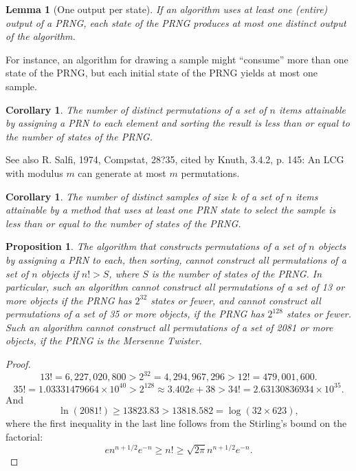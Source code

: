 \documentclass[12pt]{article}
\newtheorem{lemma}[theorem]{Lemma}
\newtheorem{corollary}[theorem]{Corollary}
\newtheorem{proposition}[theorem]{Proposition}
\begin{document}
\begin{lemma}[One output per state]
If an algorithm uses at least one (entire) output of a PRNG, each state of the PRNG produces at most one distinct output of the algorithm.
\end{lemma}

For instance, an algorithm for drawing a sample might ``consume'' more than one state of the PRNG, but each initial state of the PRNG yields at most one sample.

\begin{corollary}
The number of distinct permutations of a set of $n$ items attainable by assigning a PRN to each element and sorting the result is less than or equal to the number of states of the PRNG.
\end{corollary}

See also R. Salfi, 1974, Compstat, 28?35, cited by Knuth, 3.4.2, p. 145: An LCG with modulus $m$ can generate at most $m$ permutations.

\begin{corollary}
The number of distinct samples of size $k$ of a set of $n$ items attainable by a method that uses at least one PRN state to select the sample is less than or equal to the number of states of the PRNG.
\end{corollary}

\begin{proposition}
The algorithm that constructs permutations of a set of $n$ objects by assigning a PRN to each, then sorting, cannot construct all permutations of a set of $n$ objects if $n! > S$, where $S$ is the number of states of the PRNG. In particular, such an algorithm cannot construct all permutations of a set of 13 or more objects if the PRNG has $2^{32}$ states or fewer, and cannot construct all permutations of a set of 35 or more objects, if the PRNG has $2^{128}$ states or fewer. Such an algorithm cannot construct all permutations of a set of 2081 or more objects, if the PRNG is the Mersenne Twister.
\end{proposition}


\begin{proof}
$$13! = 6,227,020,800 > 2^{32} = 4,294,967,296 > 12! = 479,001,600.$$
$$ 35! = 1.03331479664 \times 10^{40} > 2^{128} \approx 3.402e+38 > 34! = 2.63130836934 \times 10^{35}. $$
And $$ \ln (2081!) \ge 13823.83 > 13818.582 = \log(32 \times 623),$$
where the first inequality in the last line follows from the Stirling's bound on the factorial:
$$ e n^{n+1/2} e^{-n} \ge n! \ge \sqrt{2 \pi} n^{n+1/2} e^{-n}.$$
\end{proof}
\end{document}
